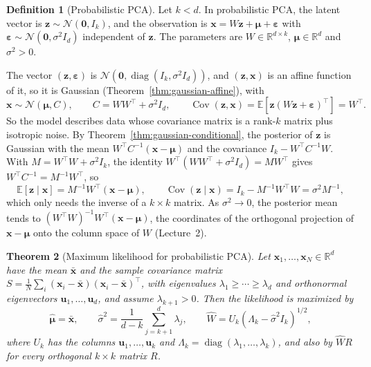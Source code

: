 \documentclass[11pt]{article}
\newcommand{\E}{\mathbb{E}}
\DeclareMathOperator{\Cov}{Cov}
\theoremstyle{definition}
\newtheorem{definition}{Definition}[section]
\theoremstyle{plain}
\newtheorem{theorem}[definition]{Theorem}
\theoremstyle{remark}
\DeclareMathOperator{\diag}{diag}
\begin{document}
\begin{definition}[Probabilistic PCA]\label{def:ppca}
    Let $k < d$. In probabilistic PCA, the latent vector is $\mathbf{z} \sim \mathcal{N}(\mathbf{0}, I_k)$, and the observation is $\mathbf{x} = W\mathbf{z} + \boldsymbol{\mu} + \boldsymbol{\varepsilon}$ with $\boldsymbol{\varepsilon} \sim \mathcal{N}(\mathbf{0}, \sigma^2I_d)$ independent of $\mathbf{z}$. The parameters are $W \in \mathbb{R}^{d \times k}$, $\boldsymbol{\mu} \in \mathbb{R}^d$ and $\sigma^2 > 0$.
\end{definition}

The vector $(\mathbf{z}, \boldsymbol{\varepsilon})$ is $\mathcal{N}(\mathbf{0}, \diag(I_k, \sigma^2I_d))$, and $(\mathbf{z}, \mathbf{x})$ is an affine function of it, so it is Gaussian (Theorem~\ref{thm:gaussian-affine}), with
\[\mathbf{x} \sim \mathcal{N}(\boldsymbol{\mu}, C), \qquad C = WW^\top + \sigma^2I_d, \qquad \Cov(\mathbf{z}, \mathbf{x}) = \E[\mathbf{z}(W\mathbf{z} + \boldsymbol{\varepsilon})^\top] = W^\top.\]
So the model describes data whose covariance matrix is a rank-$k$ matrix plus isotropic noise. By Theorem~\ref{thm:gaussian-conditional}, the posterior of $\mathbf{z}$ is Gaussian with the mean $W^\top C^{-1}(\mathbf{x} - \boldsymbol{\mu})$ and the covariance $I_k - W^\top C^{-1}W$. With $M = W^\top W + \sigma^2I_k$, the identity $W^\top(WW^\top + \sigma^2I_d) = MW^\top$ gives $W^\top C^{-1} = M^{-1}W^\top$, so
\[\E[\mathbf{z} \mid \mathbf{x}] = M^{-1}W^\top(\mathbf{x} - \boldsymbol{\mu}), \qquad \Cov(\mathbf{z} \mid \mathbf{x}) = I_k - M^{-1}W^\top W = \sigma^2M^{-1},\]
which only needs the inverse of a $k \times k$ matrix. As $\sigma^2 \to 0$, the posterior mean tends to $(W^\top W)^{-1}W^\top(\mathbf{x} - \boldsymbol{\mu})$, the coordinates of the orthogonal projection of $\mathbf{x} - \boldsymbol{\mu}$ onto the column space of $W$ (Lecture~2).

\begin{theorem}[Maximum likelihood for probabilistic PCA]\label{thm:ppca}
    Let $\mathbf{x}_1, \ldots, \mathbf{x}_N \in \mathbb{R}^d$ have the mean $\bar{\mathbf{x}}$ and the sample covariance matrix $S = \frac{1}{N}\sum_i (\mathbf{x}_i - \bar{\mathbf{x}})(\mathbf{x}_i - \bar{\mathbf{x}})^\top$, with eigenvalues $\lambda_1 \geq \cdots \geq \lambda_d$ and orthonormal eigenvectors $\mathbf{u}_1, \ldots, \mathbf{u}_d$, and assume $\lambda_{k+1} > 0$. Then the likelihood is maximized by
    \[\hat{\boldsymbol{\mu}} = \bar{\mathbf{x}}, \qquad \hat\sigma^2 = \frac{1}{d - k}\sum_{j=k+1}^d \lambda_j, \qquad \hat W = U_k(\Lambda_k - \hat\sigma^2I_k)^{1/2},\]
    where $U_k$ has the columns $\mathbf{u}_1, \ldots, \mathbf{u}_k$ and $\Lambda_k = \diag(\lambda_1, \ldots, \lambda_k)$, and also by $\hat WR$ for every orthogonal $k \times k$ matrix $R$.
\end{theorem}
\end{document}
